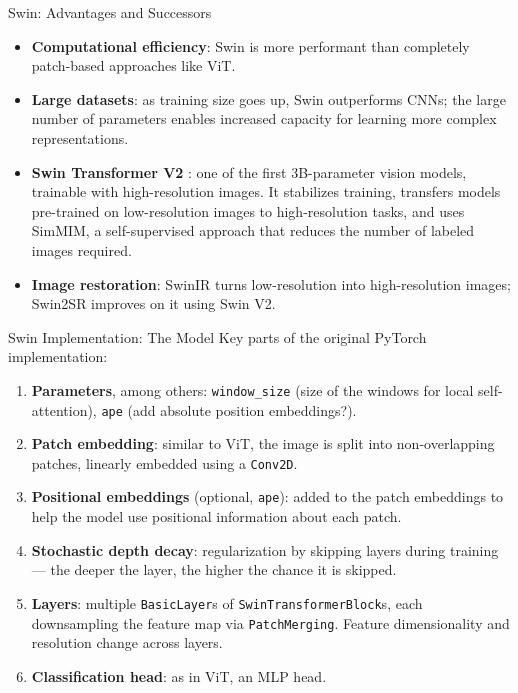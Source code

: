 \begin{frame}{Swin: Advantages and Successors}
\begin{itemize}
  \item \textbf{Computational efficiency}: Swin is more performant than completely patch-based approaches like ViT.
  \item \textbf{Large datasets}: as training size goes up, Swin outperforms CNNs; the large number of parameters enables increased capacity for learning more complex representations.
  \item \textbf{Swin Transformer V2} : one of the first 3B-parameter vision models, trainable with high-resolution images. It stabilizes training, transfers models pre-trained on low-resolution images to high-resolution tasks, and uses SimMIM, a self-supervised approach that reduces the number of labeled images required.
  \item \textbf{Image restoration}: SwinIR turns low-resolution into high-resolution images; Swin2SR improves on it using Swin V2.
\end{itemize}
\end{frame}

\begin{frame}{Swin Implementation: The Model}
\small%
Key parts of the original PyTorch implementation:
\begin{enumerate}
  \item \textbf{Parameters}, among others: \texttt{window\_size} (size of the windows for local self-attention), \texttt{ape} (add absolute position embeddings?).
  \item \textbf{Patch embedding}: similar to ViT, the image is split into non-overlapping patches, linearly embedded using a \texttt{Conv2D}.
  \item \textbf{Positional embeddings} (optional, \texttt{ape}): added to the patch embeddings to help the model use positional information about each patch.
  \item \textbf{Stochastic depth decay}: regularization by skipping layers during training --- the deeper the layer, the higher the chance it is skipped.
  \item \textbf{Layers}: multiple \texttt{BasicLayer}s of \texttt{SwinTransformerBlock}s, each downsampling the feature map via \texttt{PatchMerging}. Feature dimensionality and resolution change across layers.
  \item \textbf{Classification head}: as in ViT, an MLP head.
\end{enumerate}
\end{frame}

